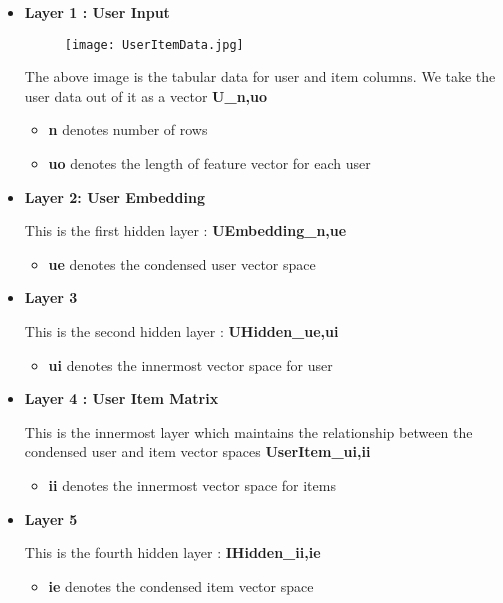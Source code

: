 \documentclass[letterpaper,twocolumn,10pt]{article}
\begin{document}
\begin{itemize}
\item \textbf{Layer 1 : User Input}

\begin{figure}[h!]
\texttt{[image: UserItemData.jpg]}
\end{figure}

The above image is the tabular data for user and item columns. We take the user data out of it as a vector \textbf{U_{n,uo}}

\begin{itemize}
\item \textbf{n} denotes number of rows
\item \textbf{uo} denotes the length of feature vector for each user
\end{itemize}

\item \textbf{Layer 2: User Embedding}

This is the first hidden layer : \textbf{UEmbedding_{n,ue}}
\begin{itemize}
\item \textbf{ue} denotes the condensed user vector space
\end{itemize}

\item \textbf{Layer 3}

This is the second hidden layer : \textbf{UHidden_{ue,ui}}
\begin{itemize}
\item \textbf{ui} denotes the innermost vector space for user
\end{itemize}

\item \textbf{Layer 4 : User Item Matrix}

This is the innermost layer which maintains the relationship between the condensed user and item vector spaces \textbf{UserItem_{ui,ii}}

\begin{itemize}
\item \textbf{ii} denotes the innermost vector space for items
\end{itemize}

\item \textbf{Layer 5}

This is the fourth hidden layer : \textbf{IHidden_{ii,ie}}

\begin{itemize}
\item \textbf{ie} denotes the condensed item vector space
\end{itemize}


\end{itemize}
\end{document}
